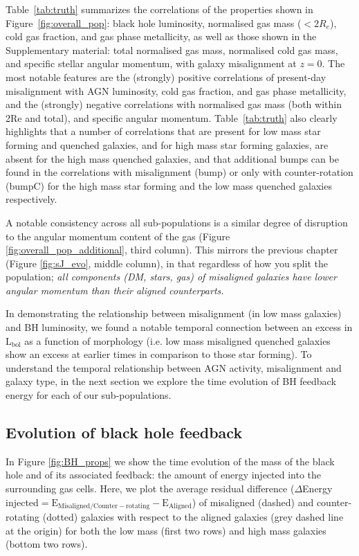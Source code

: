 Table~\ref{tab:truth} summarizes the correlations of the properties shown in Figure~\ref{fig:overall_pop}: black hole luminosity, normalised gas mass ($<2 R_e$), cold gas fraction, and gas phase metallicity, as well as those shown in the Supplementary material: total normalised gas mass, normalised cold gas mass, and specific stellar angular momentum, with galaxy misalignment at $z=0$. The most notable features are the (strongly) positive correlations of present-day misalignment with AGN luminosity, cold gas fraction, and gas phase metallicity, and the (strongly) negative correlations with normalised gas mass (both within 2Re and total), and specific angular momentum. Table~\ref{tab:truth} also clearly highlights that a number of correlations that are present for low mass star forming and quenched galaxies, and for high mass star forming galaxies, are absent for the high mass quenched galaxies, and that additional bumps can be found in the correlations with misalignment (bump) or only with counter-rotation (bumpC) for the high mass star forming and the low mass quenched galaxies respectively. 

A notable consistency across all sub-populations is a similar degree of disruption to the angular momentum content of the gas (Figure \ref{fig:overall_pop_additional}, third column). This mirrors the previous chapter (Figure \ref{fig:sJ_evo}, middle column), in that regardless of how you split the population; \textit{all components (DM, stars, gas) of misaligned galaxies have lower angular momentum than their aligned counterparts.}

In demonstrating the relationship between misalignment (in low mass galaxies) and BH luminosity, we found a notable temporal connection between an excess in $\mathrm{L_{bol}}$ as a function of morphology (i.e. low mass misaligned quenched galaxies show an excess at earlier times in comparison to those star forming). To understand the temporal relationship between AGN activity, misalignment and galaxy type, in the next section we explore the time evolution of BH feedback energy for each of our sub-populations.

\subsection{Evolution of black hole feedback} \label{sec:evolution}
In Figure \ref{fig:BH_props} we show the time evolution of the mass of the black hole and of its associated feedback: the amount of energy injected into the surrounding gas cells. Here, we plot the average residual difference ($\Delta$Energy injected$\mathrm{ = E_{Misaligned/Counter-rotating} - E_{Aligned}}$) of misaligned (dashed) and counter-rotating (dotted) galaxies with respect to the aligned galaxies (grey dashed line at the origin) for both the low mass (first two rows) and high mass galaxies (bottom two rows).

